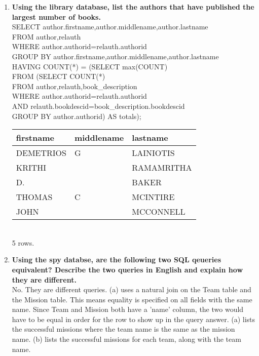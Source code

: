\documentclass{article}
\begin{document}
\begin{enumerate}
\item
\textbf{Using the library database, list the authors that have published the largest number
of books.\\}
SELECT author.firstname,author.middlename,author.lastname\\
FROM author,relauth\\
WHERE author.authorid=relauth.authorid\\
GROUP BY author.firstname,author.middlename,author.lastname\\
HAVING COUNT(*) = (SELECT max(COUNT)\\
\hspace*{4 cm}      FROM (SELECT COUNT(*)\\
\hspace*{6 cm}            FROM author,relauth,book\_description\\
\hspace*{6 cm}            WHERE author.authorid=relauth.authorid\\
\hspace*{6 cm}            AND relauth.bookdescid=book\_description.bookdescid\\
\hspace*{6 cm}            GROUP BY author.authorid) AS totals);\\
\begin{tabular}{l|l|l}
 firstname & middlename &  lastname  \\
\hline
 DEMETRIOS & G          & LAINIOTIS\\
 KRITHI    &            & RAMAMRITHA\\
 D.        &            & BAKER\\
 THOMAS    & C          & MCINTIRE\\
 JOHN      &            & MCCONNELL\\
\end{tabular}
\\5 rows.\\

\pagebreak

\item
\textbf{Using the spy databse, are the following two SQL qeueries equivalent? Describe the
two queries in English and explain how they are different.\\}
No. They are different queries. (a) uses a natural join on the Team table and the Mission
table. This means equality is specified on all fields with the same name. Since Team and
Mission both have a 'name' column, the two would have to be equal in order for the row to
show up in the query answer. (a) lists the successful missions where the team name is the
same as the mission name. (b) lists the successful missions for each team, along with the
team name.\\


\end{enumerate}
\end{document}
